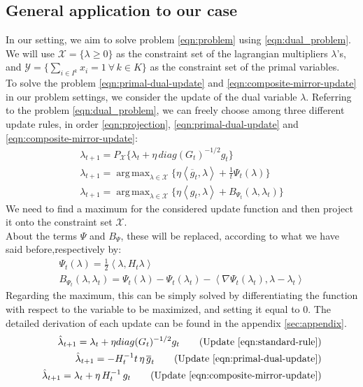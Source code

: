 \documentclass[notitlepage]{article}
\DeclareMathOperator*{\argmax}{arg\,max}
\begin{document}
\subsection{General application to our case}
In our setting, we aim to solve problem \eqref{eqn:problem} using \eqref{eqn:dual_problem}. We will use $\mathcal{X} = \{ \lambda \ge 0 \}$ as the constraint set of the lagrangian multipliers $\lambda$'s, and $\mathcal{Y} = \{ \sum_{i \in I^k} x_i = 1 \ \forall \, k \in K\}$ 
as the constraint set of the primal variables.\\
To solve the problem \eqref{eqn:primal-dual-update} and \eqref{eqn:composite-mirror-update} in our problem settings, we consider the update of the dual variable $\lambda$. Referring to the problem \eqref{eqn:dual_problem}, we can freely choose  
among three different update rules, in order \eqref{eqn:projection}, \eqref{eqn:primal-dual-update} and \eqref{eqn:composite-mirror-update}:
\begin{equation}
  \begin{gathered}
    \lambda_{t+1} = P_{\mathcal{X}} \{ \lambda_t + \eta\, diag(G_t)^{-1/2} g_t \} \\
    \lambda_{t+1} = \argmax_{\lambda \in \mathcal{X}} \{ \eta \left\langle \overline{g}_t,\lambda \right\rangle + \frac{1}{t} \Psi_t(\lambda) \} \\
    \lambda_{t+1} = \argmax_{\lambda \in \mathcal{X}} \{ \eta \left\langle g_t,\lambda \right\rangle + B_{\Psi_t} (\lambda,\lambda_t) \}
    \label{eqn:updates}  
  \end{gathered}
\end{equation}
We need to find a maximum for the considered update function and then project it onto the constraint set $\mathcal{X}$.\\
About the terms $\Psi$ and $B_\Psi$, these will be replaced, according to what we have said before,respectively by:
\begin{gather*}
  \Psi_t(\lambda) = \frac{1}{2} \left\langle \lambda,H_t \lambda \right\rangle \\
  B_{\Psi_t} (\lambda,\lambda_t) = \Psi_t(\lambda) - \Psi_t(\lambda_t) - \left\langle \nabla \Psi_t(\lambda_t),\lambda-\lambda_t \right\rangle
\end{gather*}
Regarding the maximum, this can be simply solved by differentiating the function with respect to the variable to be maximized, and setting it equal to $0$. The detailed derivation of each update can be found in the appendix \ref{sec:appendix}.
\begin{subequations}
  \label{eqn:minimized}
  \begin{align}
    \hat{\lambda}_{t+1} = \lambda_t + \eta diag(G_t)^{-1/2} g_t 
    \tag{Update \eqref{eqn:standard-rule}} \\
    \hat{\lambda}_{t+1} = -H_t^{-1} t\, \eta\, \overline{g}_t
    \tag{Update \eqref{eqn:primal-dual-update}} \\
    \hat{\lambda}_{t+1} = \lambda_t + \eta\, H_t^{-1}\, g_t 
    \tag{Update \eqref{eqn:composite-mirror-update}}
  \end{align}
\end{subequations}
\end{document}
